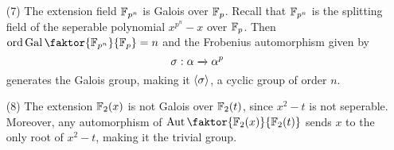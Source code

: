 \begin{example}
\begin{enumerate}
        \item[(7)] The extension field $\mathbb{F}_{p^n}$ is Galois over $\mathbb{F}_p$.  Recall
            that $\mathbb{F}_{p^n}$ is the splitting field of the seperable polynomial
            $x^{p^n}-x$ over $\mathbb{F}_p$. Then
            $\ord{\Gal{\faktor{\F_{p^n}}{\F_p}}}=n$ and the Frobenius
            automorphism given by
            \begin{equation*}
                \sigma:\alpha \xrightarrow{} \alpha^p
            \end{equation*}
            generates the Galois group, making it $\langle \sigma \rangle$, a cyclic
            group of order $n$.

        \item[(8)] The extension $\mathbb{F}_2(x)$ is not Galois over $\mathbb{F}_2(t)$, since
            $x^2-t$ is not seperable. Moreover, any automorphism of
            $\Aut{\faktor{\F_2(x)}{\F_2(t)}}$ sends $x$ to the only root of
            $x^2-t$, making it the trivial group.
    \end{enumerate}
\end{example}
